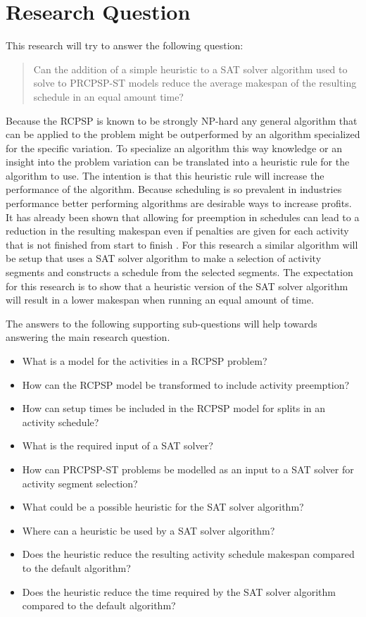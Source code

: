 \documentclass[english]{article}
\begin{document}
\section*{Research Question}
This research will try to answer the following question:
\begin{quote}
Can the addition of a simple heuristic to a SAT solver algorithm used to solve to PRCPSP-ST models reduce the average makespan of the resulting schedule in an equal amount time?
\end{quote}
Because the RCPSP is known to be strongly NP-hard \cite{RN20} any general algorithm that can be applied to the problem might be outperformed by an algorithm specialized for the specific variation.
To specialize an algorithm this way knowledge or an insight into the problem variation can be translated into a heuristic rule for the algorithm to use. The intention is that this heuristic rule will increase the performance of the algorithm. Because scheduling is so prevalent in industries performance better performing algorithms are desirable ways to increase profits.\\
It has already been shown that allowing for preemption in schedules can lead to a reduction in the resulting makespan even if penalties are given for each activity that is not finished from start to finish \cite{RN1}.
For this research a similar algorithm will be setup that uses a SAT solver algorithm to make a selection of activity segments and constructs a schedule from the selected segments. The expectation for this research is to show that a heuristic version of the SAT solver algorithm will result in a lower makespan when running an equal amount of time.

The answers to the following supporting sub-questions will help towards answering the main research question.
{\begin{itemize}
  \item What is a model for the activities in a RCPSP problem?
  \item How can the RCPSP model be transformed to include activity preemption?
  \item How can setup times be included in the RCPSP model for splits in an activity schedule?
  \item What is the required input of a SAT solver?
  \item How can PRCPSP-ST problems be modelled as an input to a SAT solver for activity segment selection?
  \item What could be a possible heuristic for the SAT solver algorithm?
  \item Where can a heuristic be used by a SAT solver algorithm?
  \item Does the heuristic reduce the resulting activity schedule makespan compared to the default algorithm?
  \item Does the heuristic reduce the time required by the SAT solver algorithm compared to the default algorithm?
\end{itemize}{}}
\end{document}
